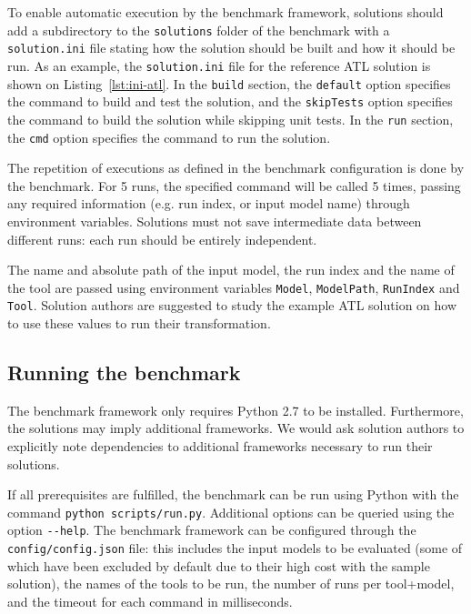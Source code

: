 \documentclass[a4paper]{scrartcl}
\newcommand*{\file}[1]{\texttt{#1}}
\begin{document}


To enable automatic execution by the benchmark framework, solutions should add a
subdirectory to the \file{solutions} folder of the benchmark with a
\file{solution.ini} file stating how the solution should be built and how it
should be run. As an example, the \file{solution.ini} file for the reference ATL
solution is shown on Listing~\ref{lst:ini-atl}. In the \file{build} section, the
\file{default} option specifies the command to build and test the solution, and
the \file{skipTests} option specifies the command to build the solution while
skipping unit tests. In the \file{run} section, the \file{cmd} option specifies
the command to run the solution.

The repetition of executions as defined in the benchmark configuration is done
by the benchmark. For 5 runs, the specified command will be called 5 times,
passing any required information (e.g. run index, or input model name) through
environment variables. Solutions must not save intermediate data between
different runs: each run should be entirely independent.

The name and absolute path of the input model, the run index and the name of the
tool are passed using environment variables \file{Model}, \file{ModelPath},
\file{RunIndex} and \file{Tool}. Solution authors are suggested to study the
example ATL solution on how to use these values to run their transformation.

\subsection{Running the benchmark}
\label{sec:running-benchmark}

The benchmark framework only requires Python 2.7 to be installed. Furthermore,
the solutions may imply additional frameworks. We would ask solution authors to
explicitly note dependencies to additional frameworks necessary to run their
solutions.

If all prerequisites are fulfilled, the benchmark can be run using Python with
the command \file{python scripts/run.py}. Additional options can be queried
using the option \file{{-}{-}help}. The benchmark framework can be configured
through the \file{config/config.json} file: this includes the input models to be
evaluated (some of which have been excluded by default due to their high cost with the sample solution), the names of the tools to be run, the number of runs per tool+model, and the timeout for each command in milliseconds.
\end{document}
